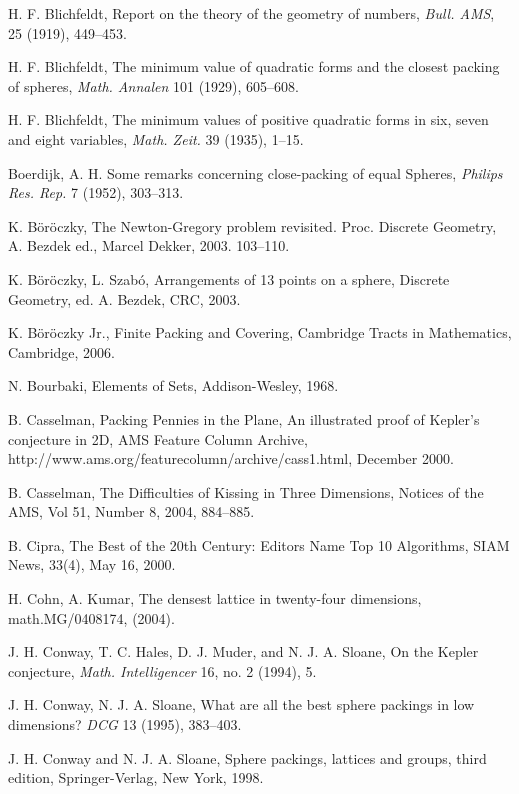 \begin{thebibliography}{CHMS94}
 H. F. Blichfeldt,
    Report on the theory of the geometry of numbers,
    {\it Bull. AMS}, 25 (1919), 449--453.

 H. F. Blichfeldt,
    The minimum value of quadratic forms and the closest
    packing of spheres, {\it Math. Annalen} 101 (1929), 605--608.

 H. F. Blichfeldt,
    The minimum values of positive quadratic forms in six,
    seven and eight variables, {\it Math. Zeit.} 39 (1935), 1--15.

 Boerdijk, A. H. Some remarks concerning close-packing
of equal Spheres, {\it Philips Res. Rep.} 7 (1952), 303--313.


  K. B\"or\"oczky, 
The Newton-Gregory problem revisited. Proc. Discrete Geometry, A. Bezdek ed., Marcel Dekker, 2003. 103--110.

  K. B\"or\"oczky, L. Szab\'o,
Arrangements of 13 points on a sphere, 
Discrete Geometry, ed. A. Bezdek, CRC, 2003.

 K. B\"or\"oczky Jr., Finite Packing and
Covering, Cambridge Tracts in Mathematics, Cambridge, 2006.

 N. Bourbaki, Elements of Sets, Addison-Wesley, 1968.

 B. Casselman, Packing Pennies in the Plane,
An illustrated proof of Kepler's conjecture in 2D,  AMS Feature Column
Archive,
http://www.ams.org/featurecolumn/archive/cass1.html, December 2000.

  B. Casselman, The Difficulties of Kissing in
  Three Dimensions, Notices of the AMS,  Vol 51, Number 8, 2004, 884--885.

 B. Cipra, The Best of the 20th Century: Editors
Name Top 10 Algorithms, SIAM News, 33(4), May 16, 2000.

 H. Cohn, A. Kumar, The densest lattice in twenty-four
dimensions, math.MG/0408174, (2004).

 J. H. Conway, T. C. Hales, D. J. Muder, and N. J. A. Sloane,
    On the Kepler conjecture, {\it Math. Intelligencer} 16,
    no. 2 (1994), 5.

  J. H. Conway,  N. J. A. Sloane, What are all the
best sphere packings in low dimensions? {\it DCG} 13 (1995),
383--403.

 J. H. Conway and N. J. A. Sloane, Sphere packings, lattices
    and groups,  third edition, Springer-Verlag, New York, 1998.


\end{thebibliography}
